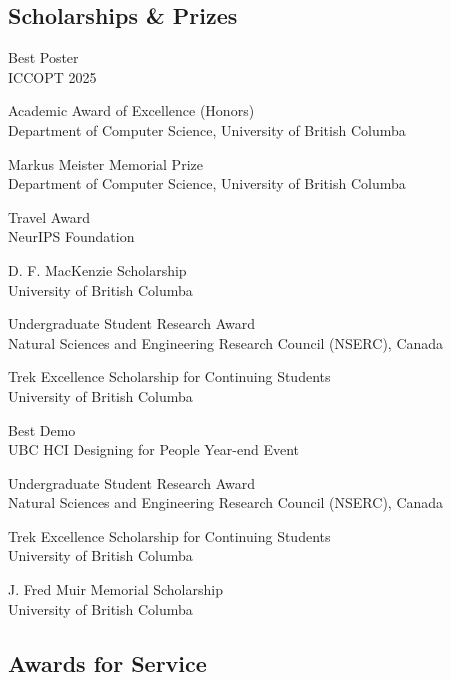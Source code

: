 \documentclass[11pt, a4paper]{article}
\newcommand{\mleftsize}{4.75em}
\begin{document}
\subsection{Scholarships \& Prizes}\nobreak
\begin{description}[leftmargin=\mleftsize,style=nextline,font=\normalfont\space]
    \item[2025] Best Poster\\
          ICCOPT 2025
    \item[2018] Academic Award of Excellence (Honors)\\
          Department of Computer Science, University of British Columba
    \item[2018] Markus Meister Memorial Prize\\
          Department of Computer Science, University of British Columba
    \item[2018] Travel Award\\
          NeurIPS Foundation
    \item[2017] D. F. MacKenzie Scholarship\\
          University of British Columba
    \item[2017] Undergraduate Student Research Award\\
          Natural Sciences and Engineering Research Council (NSERC), Canada
    \item[2017] Trek Excellence Scholarship for Continuing Students\\
          University of British Columba
    \item[2016] Best Demo\\
          UBC HCI Designing for People Year-end Event
    \item[2016] Undergraduate Student Research Award\\
          Natural Sciences and Engineering Research Council (NSERC), Canada
    \item[2016] Trek Excellence Scholarship for Continuing Students\\
          University of British Columba
    \item[2016] J. Fred Muir Memorial Scholarship\\
          University of British Columba
\end{description}

\subsection{Awards for Service} \hfill
\end{document}
